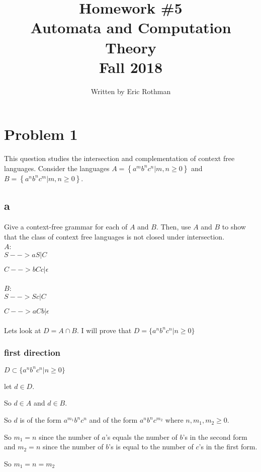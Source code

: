\documentclass[letterpaper, 11pt]{article}
\begin{document}
\title{Homework \#5 \\ Automata and Computation Theory \\Fall 2018}
\author{Written by Eric Rothman}

\maketitle

\section*{Problem 1}
This question studies the intersection and complementation of context free languages.
Consider the languages $A = \left\{ a ^ { m } b ^ { n } c ^ { n } | m , n \geq 0 \right\}$ and $B = \left\{ a ^ { n } b ^ { n } c ^ { m } | m , n \geq 0 \right\}$.
\subsection*{a}
Give a context-free grammar for each of $A$ and $B$. Then, use $A$ and $B$ to show that the class of context free languages is not closed under intersection.\\
$A$:\\

$S --> aS|C$

$C --> bCc|\epsilon$\\\\
$B$:\\

$S --> Sc|C$

$C --> aCb|\epsilon$\\\\
Lets look at $D = A \cap B$.
I will prove that $D = \{a^nb^nc^n | n \geq 0\}$
\subsubsection*{first direction}
$D \subset \{a^nb^nc^n | n \geq 0\}$

let $d \in D$.

So $d \in A$ and $d \in B$.

So $d$ is of the form $a ^ { m_1 } b ^ { n } c ^ { n }$ and of the form $a ^ { n } b ^ { n } c ^ { m_2 }$ where $n,m_1,m_2 \geq 0$.

So $m_1 = n$ since the number of $a$'s equals the number of $b$'s in the second form and $m_2 = n$ since the number of $b$'s is equal to the number of $c$'s in the first form.

So $m_1 = n = m_2$
\end{document}
